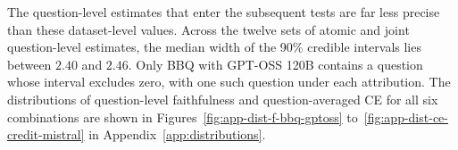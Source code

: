 The question-level estimates that enter the subsequent tests are far less precise than these dataset-level values. Across the twelve sets of atomic and joint question-level estimates, the median width of the 90\% credible intervals lies between $2.40$ and $2.46$. Only BBQ with GPT-OSS 120B contains a question whose interval excludes zero, with one such question under each attribution. The distributions of question-level faithfulness and question-averaged CE for all six combinations are shown in Figures~\ref{fig:app-dist-f-bbq-gptoss} to~\ref{fig:app-dist-ce-credit-mistral} in Appendix~\ref{app:distributions}.
